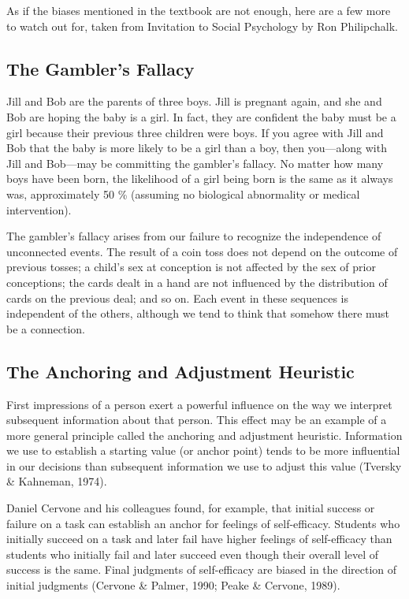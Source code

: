\documentclass[
]{book}
\begin{document}
As if the biases mentioned in the textbook are not enough, here are a few more to watch out for, taken from Invitation to Social Psychology by Ron Philipchalk.

\hypertarget{the-gamblers-fallacy}{%
\subsection*{The Gambler's Fallacy}\label{the-gamblers-fallacy}}

Jill and Bob are the parents of three boys. Jill is pregnant again, and she and Bob are hoping the baby is a girl. In fact, they are confident the baby must be a girl because their previous three children were boys. If you agree with Jill and Bob that the baby is more likely to be a girl than a boy, then you---along with Jill and Bob---may be committing the gambler's fallacy. No matter how many boys have been born, the likelihood of a girl being born is the same as it always was, approximately 50 \% (assuming no biological abnormality or medical intervention).

The gambler's fallacy arises from our failure to recognize the independence of unconnected events. The result of a coin toss does not depend on the outcome of previous tosses; a child's sex at conception is not affected by the sex of prior conceptions; the cards dealt in a hand are not influenced by the distribution of cards on the previous deal; and so on. Each event in these sequences is independent of the others, although we tend to think that somehow there must be a connection.

\hypertarget{the-anchoring-and-adjustment-heuristic}{%
\subsection*{The Anchoring and Adjustment Heuristic}\label{the-anchoring-and-adjustment-heuristic}}

First impressions of a person exert a powerful influence on the way we interpret subsequent information about that person. This effect may be an example of a more general principle called the anchoring and adjustment heuristic. Information we use to establish a starting value (or anchor point) tends to be more influential in our decisions than subsequent information we use to adjust this value (Tversky \& Kahneman, 1974).

Daniel Cervone and his colleagues found, for example, that initial success or failure on a task can establish an anchor for feelings of self-efficacy. Students who initially succeed on a task and later fail have higher feelings of self-efficacy than students who initially fail and later succeed even though their overall level of success is the same. Final judgments of self-efficacy are biased in the direction of initial judgments (Cervone \& Palmer, 1990; Peake \& Cervone, 1989).
\end{document}
